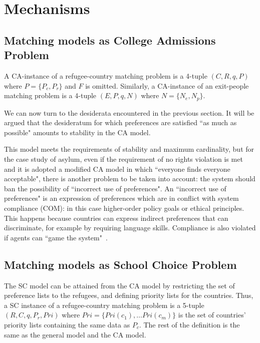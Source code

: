 \section{Mechanisms}\label{mechanisms}%


\subsection{Matching models as College Admissions Problem}\label{matching-model-as-college-admissions-problem}%

A CA-instance of a refugee-country matching problem is a 4-tuple \((C, R, q, P)\) where \(P = \{P_c, P_r\}\) and \(F\) is omitted.
Similarly, a CA-instance of an exit-people matching problem is a 4-tuple \((E, P, q, N)\) where \(N = \{N_e ,  N_p\}\).

We can now turn to the desiderata encountered in the previous section.
It will be argued that the desideratum for which preferences are satisfied “as much as possible" amounts to stability in the CA
model.

This model meets the requirements of stability and maximum cardinality, but for the case study of asylum, even if the requirement of no rights violation is met and it is adopted a modified CA model in which “everyone finds everyone acceptable", there is another problem to be taken into account: the system should ban the possibility of “incorrect use of preferences".
An “incorrect use of preferences" is an expression of preferences which are in conflict with system compliance (COM): in this case higher-order policy goals or ethical principles.
This happens because countries can express indirect preferences that can discriminate, for example by requiring language skills.
Compliance is also violated if agents can “game the system"~\cite{basshuysen}.


\subsection{Matching models as School Choice Problem}\label{matching-model-as-school-choice-problem}%

The SC model can be attained from the CA model by restricting the set of preference lists to the refugees, and defining priority lists for the countries.
Thus, a SC instance of a refugee-country matching problem is a 5-tuple \((R, C, q, P_r, Pri)\) where \(Pri = \{Pri(c_1), \ldots Pri(c_m)\}\) is the set of countries’ priority lists containing the same data as \(P_c\).
The rest of the definition is the same as the general model and the CA model.


